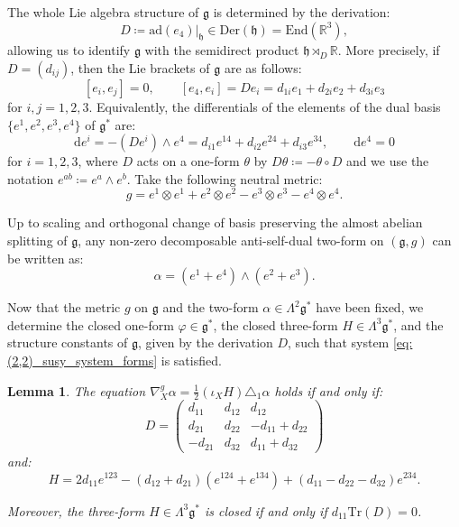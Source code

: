 \documentclass[10pt,reqno]{amsart}
\newtheorem{lemma}[theorem]{Lemma}
\theoremstyle{definition}
\theoremstyle{remark}
\newcommand{\R}{\mathbb{R}}
\newcommand{\Tr}{\mathrm{Tr}}
\newcommand{\End}{\mathrm{End}}
\renewcommand{\d}{\mathrm{d}}
\begin{document}
The whole Lie algebra structure of $\mathfrak{g}$ is determined by the derivation: $$D\coloneqq\mathrm{ad}(e_4)|_{\mathfrak{h}}\in\mathrm{Der}(\mathfrak{h})=\End(\R^3),$$ allowing us to identify $\mathfrak{g}$ with the semidirect product $\mathfrak{h}\rtimes_D\R$. More precisely, if $D=(d_{ij})$, then the Lie brackets of $\mathfrak{g}$ are as follows: $$[e_i,e_j]=0,\qquad [e_4,e_i]=De_i=d_{1i}e_1+d_{2i}e_2+d_{3i}e_3$$ for $i,j=1,2,3$. Equivalently, the differentials of the elements of the dual basis $\{e^1,e^2,e^3,e^4\}$ of $\mathfrak{g}^*$ are: $$\d e^i=-(De^i)\wedge e^4=d_{i1}e^{14}+d_{i2}e^{24}+d_{i3}e^{34},\qquad \d e^4=0$$ for $i=1,2,3$, where $D$ acts on a one-form $\theta$ by $D\theta\coloneqq-\theta\circ D$ and we use the notation $e^{ab}\coloneqq e^a\wedge e^b$. Take the following neutral metric: $$g=e^1\otimes e^1+e^2\otimes e^2-e^3\otimes e^3-e^4\otimes e^4.$$

Up to scaling and orthogonal change of basis preserving the almost abelian splitting of $\mathfrak{g}$, any non-zero decomposable anti-self-dual two-form on $(\mathfrak{g},g)$ can be written as: $$\alpha=(e^1+e^4)\wedge(e^2+e^3).$$

Now that the metric $g$ on $\mathfrak{g}$ and the two-form $\alpha\in\Lambda^2\mathfrak{g}^*$ have been fixed, we determine the closed one-form $\varphi\in\mathfrak{g}^*$, the closed three-form $H\in\Lambda^3\mathfrak{g}^*$, and the structure constants of $\mathfrak{g}$, given by the derivation $D$, such that system \eqref{eq:(2,2)_susy_system_forms} is satisfied.

\begin{lemma}
    The equation $\nabla^g_X\alpha=\tfrac{1}{2}(\iota_XH)\triangle_1\alpha$ holds if and only if: $$D=\begin{pmatrix}
        d_{11}&d_{12}&d_{12}\\
        d_{21}&d_{22}&-d_{11}+d_{22}\\
        -d_{21}&d_{32}&d_{11}+d_{32}
    \end{pmatrix}$$ and: $$H=2d_{11}e^{123}-(d_{12}+d_{21})(e^{124}+e^{134})+(d_{11}-d_{22}-d_{32})e^{234}.$$
    
    Moreover, the three-form $H\in\Lambda^3\mathfrak{g}^*$ is closed if and only if $d_{11}\Tr(D)=0$.
\end{lemma}
\end{document}
